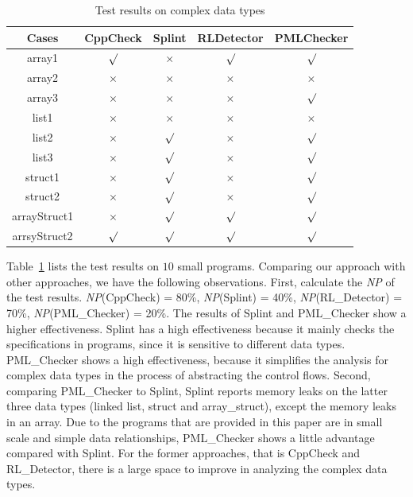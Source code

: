 \begin{table}[!h]
\center
\caption{Test results on complex data types}\label{tab:8}
\begin{tabular}{|c|c|c|c|c|}
\hline
\textbf{Cases}  & \textbf{CppCheck} & \textbf{Splint} & \textbf{RLDetector} & \textbf{PMLChecker}\\
\hline
array1	 &	$\surd$ & $\times$ & $\surd$ & $\surd$\\
\hline
array2  & $\times$ & $\times$ & $\times$ & $\times$ \\
\hline
array3	 & $\times$ &	$\times$ & $\times$ & $\surd$\\
\hline
list1 	& $\times$ &$\times$ & $\times$ & $\times$\\
\hline
list2	 & $\times$ & $\surd$ & $\times$ & $\surd$\\
\hline
list3	 &	$\times$	& $\surd$ & $\times$ & $\surd$\\
\hline
struct1	 & $\times$ & $\surd$ & $\times$ & $\surd$\\
\hline
struct2	 & $\times$ & $\surd$ & $\times$ & $\surd$\\
\hline
arrayStruct1	 & $\times$ & $\surd$ & $\surd$ & $\surd$\\
\hline
arrsyStruct2  & $\surd$ & $\surd$ & $\surd$& $\surd$\\
\hline
\end{tabular}
\end{table}


Table~\ref{tab:8} lists the test results on $10$ small programs. Comparing our approach with other approaches, we have the following observations.
First, calculate the \textit{NP} of the test results. \textit{NP}(CppCheck) = 80\%, \textit{NP}(Splint) = 40\%, \textit{NP}(RL\_Detector) = 70\%, \textit{NP}(PML\_Checker) = 20\%. The results of Splint and PML\_Checker show a higher effectiveness. Splint has a high effectiveness because it mainly checks the specifications in programs, since it is sensitive to different data types. PML\_Checker shows a high effectiveness, because it simplifies the analysis for complex data types in the process of abstracting the control flows.
Second, comparing PML\_Checker to Splint, Splint reports memory leaks on the latter three data types (linked list, struct and array\_struct), except the memory leaks in an array. Due to the programs that are provided in this paper are in small scale and simple data relationships, PML\_Checker shows a little advantage compared with Splint. For the former approaches, that is CppCheck and RL\_Detector, there is a large space to improve in analyzing the complex data types.

